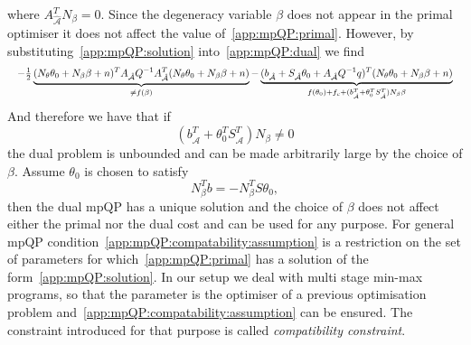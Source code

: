 %
where $A^T_{\hat{\mathcal A}} N_\beta=0$. Since the degeneracy variable $\beta$ does not appear in the
primal optimiser it does not affect the value of~\eqref{app:mpQP:primal}.
%
However, by substituting~\eqref{app:mpQP:solution} into~\eqref{app:mpQP:dual}
we find
%
\begin{equation}\Resize{
	-\frac{1}{2}\underbrace{(N_\theta \theta_0 + N_\beta \beta + n)^T A_{\hat{\mathcal A}} Q^{-1}A^T_{\hat{\mathcal A}} 
	(N_\theta \theta_0 + N_\beta \beta + n)}_{\neq f(\beta)} -\underbrace{( 
	b_{\hat{\mathcal A}} + S_{\hat{\mathcal A}}\theta_0 + A_{\hat{\mathcal A}} Q^{-1} q)^T(N_\theta \theta_0 + N_\beta \beta + 
	n)}_{f(\theta_0)+f_c + (b^T_{\hat{\mathcal A}}+\theta^T_0S^T_{\hat{\mathcal A}})N_\beta 
	\beta}
	}
\end{equation}
%
And therefore we have that if
%
\begin{equation}
	(b^T_{\hat{\mathcal A}}+\theta^T_0 S^T_{\hat{\mathcal A}})N_\beta \neq 0
\end{equation}
%
the dual problem is unbounded and can be made arbitrarily large by the choice of $\beta$. Assume
$\theta_0$ is chosen to satisfy 
%
\begin{equation}\label{app:mpQP:compatability:assumption}
	N_\beta^Tb = -N_\beta^TS\theta_0,
\end{equation} 
%
then the dual mpQP has a unique solution
and the choice of $\beta$ does not affect either the primal nor the dual cost and can be used for
any purpose. For general mpQP condition~\eqref{app:mpQP:compatability:assumption} is a restriction on the set
of parameters for which~\eqref{app:mpQP:primal} has a solution of the form~\eqref{app:mpQP:solution}.
%
In our setup we deal with multi stage min-max programs, so that the parameter is the optimiser 
of a previous optimisation problem and~\eqref{app:mpQP:compatability:assumption} can be ensured. 
%
The constraint introduced for that purpose is called \emph{compatibility constraint}. 


